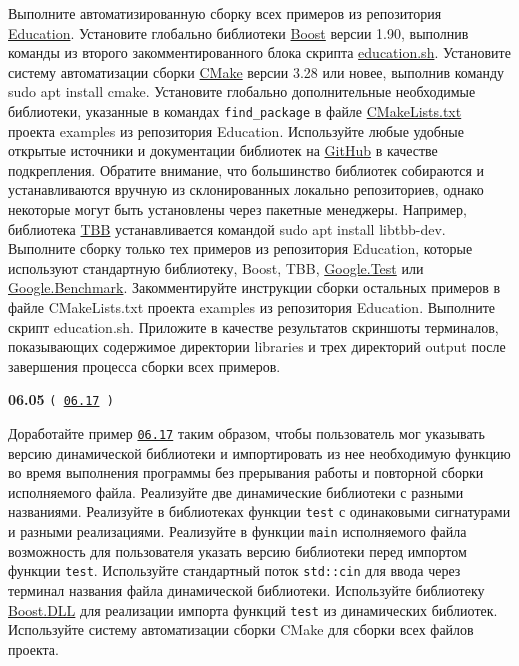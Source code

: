 \documentclass[a4paper,12pt]{article}
\begin{document}
Выполните автоматизированную сборку всех примеров из репозитория \href{https://github.com/i-s-m-mipt/Education/tree/master}{Education}. Установите глобально библиотеки \href{https://www.boost.org/}{Boost} версии 1.90, выполнив команды из второго закомментированного блока скрипта \href{https://github.com/i-s-m-mipt/Education/blob/master/education.sh}{education.sh}. Установите систему автоматизации сборки \href{https://cmake.org/}{CMake} версии 3.28 или новее, выполнив команду sudo apt install cmake. Установите глобально дополнительные необходимые библиотеки, указанные в командах \lstinline{find_package} в файле \href{https://github.com/i-s-m-mipt/Education/blob/master/projects/examples/CMakeLists.txt}{CMakeLists.txt} проекта examples из репозитория Education. Используйте любые удобные открытые источники и документации библиотек на \href{https://github.com/}{GitHub} в качестве подкрепления. Обратите внимание, что большинство библиотек собираются и устанавливаются вручную из склонированных локально репозиториев, однако некоторые могут быть установлены через пакетные менеджеры. Например, библиотека \href{https://github.com/uxlfoundation/oneTBB}{TBB} устанавливается командой sudo apt install libtbb-dev. Выполните сборку только тех примеров из репозитория Education, которые используют стандартную библиотеку, Boost, TBB, \href{https://github.com/google/googletest}{Google.Test} или \href{https://github.com/google/benchmark}{Google.Benchmark}. Закомментируйте инструкции сборки остальных примеров в файле CMakeLists.txt проекта examples из репозитория Education. Выполните скрипт education.sh. Приложите в качестве результатов скриншоты терминалов, показывающих содержимое директории libraries и трех директорий output после завершения процесса сборки всех примеров.

\bigskip

{\large \textbf{06.05} \texttt{(\,\href{https://github.com/i-s-m-mipt/Education/blob/master/projects/examples/source/06.17.cpp}{06.17}\,)}}

\bigskip

Доработайте пример \href{https://github.com/i-s-m-mipt/Education/blob/master/projects/examples/source/06.17.cpp}{\texttt{06.17}} таким образом, чтобы пользователь мог указывать версию динамической библиотеки и импортировать из нее необходимую функцию во время выполнения программы без прерывания работы и повторной сборки исполняемого файла. Реализуйте две динамические библиотеки с разными названиями. Реализуйте в библиотеках функции \lstinline{test} с одинаковыми сигнатурами и разными реализациями. Реализуйте в функции \lstinline{main} исполняемого файла возможность для пользователя указать версию библиотеки перед импортом функции \lstinline{test}. Используйте стандартный поток \lstinline{std::cin} для ввода через терминал названия файла динамической библиотеки. Используйте библиотеку \href{https://www.boost.org/doc/libs/latest/doc/html/boost_dll.html}{Boost.DLL} для реализации импорта функций \lstinline{test} из динамических библиотек. Используйте систему автоматизации сборки CMake для сборки всех файлов проекта.
\end{document}
